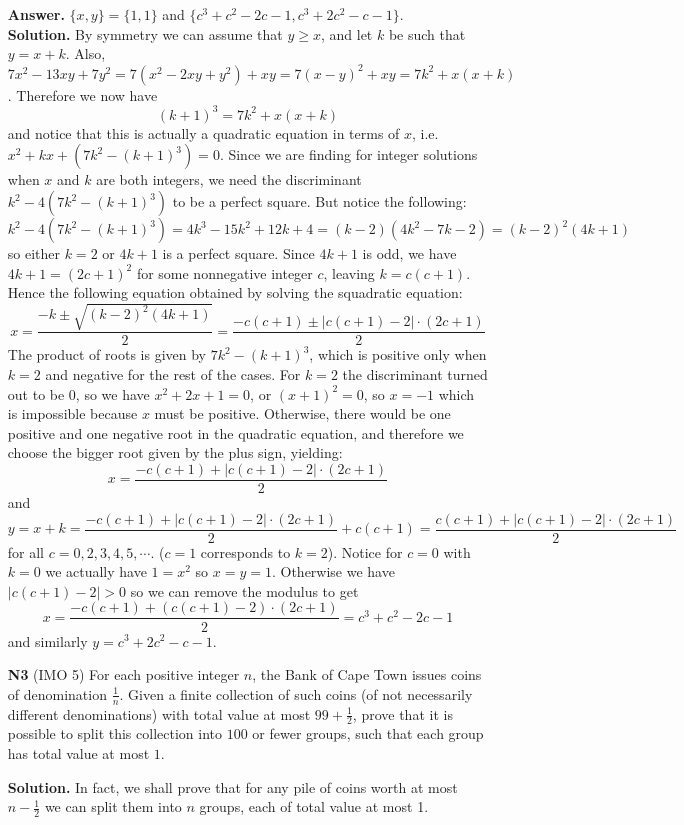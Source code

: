 \documentclass[11pt,a4paper]{article}
\begin{document}
\begin{enumerate}
	\textbf{Answer.} $\{x, y\}=\{1, 1\}$ and $\{c^3+c^2-2c-1, c^3+2c^2-c-1\}$. \\
	\textbf{Solution.} By symmetry we can assume that $y\ge x$, and let $k$ be such that $y=x+k$. Also, $7x^2-13xy+7y^2=7(x^2-2xy+y^2)+xy=7(x-y)^2+xy=7k^2+x(x+k)$. Therefore we now have 
	\[(k+1)^3 = 7k^2+x(x+k)
	\]
	and notice that this is actually a quadratic equation in terms of $x$, i.e. $x^2+kx+(7k^2-(k+1)^3)=0$. Since we are finding for integer solutions when $x$ and $k$ are both integers, we need the discriminant $k^2-4(7k^2-(k+1)^3)$ to be a perfect square. But notice the following: 
	\[
	k^2-4(7k^2-(k+1)^3)=4k^3-15k^2+12k+4=(k-2)(4k^2-7k-2)=(k-2)^2(4k+1)
	\]
	so either $k=2$ or $4k+1$ is a perfect square. Since $4k+1$ is odd, we have $4k+1=(2c+1)^2$ for some nonnegative integer $c$, leaving $k=c(c+1)$. Hence the following equation obtained by solving the squadratic equation: 
	\[
	x=\frac{-k\pm \sqrt{(k-2)^2(4k+1)}}{2}
	=\frac{-c(c+1)\pm |c(c+1)-2|\cdot (2c+1)}{2}
	\]
	The product of roots is given by $7k^2-(k+1)^3$, which is positive only when $k=2$ and negative for the rest of the cases. For $k=2$ the discriminant turned out to be 0, so we have $x^2+2x+1=0$, or $(x+1)^2=0$, so $x=-1$ which is impossible because $x$ must be positive. Otherwise, there would be one positive and one negative root in the quadratic equation, and therefore we choose the bigger root given by the plus sign, yielding: 
	\[
	x=\frac{-c(c+1)+ |c(c+1)-2|\cdot (2c+1)}{2}\]
	and
	\[
	y=x+k = \frac{-c(c+1)+ |c(c+1)-2|\cdot (2c+1)}{2} + c(c+1) 
	=\frac{c(c+1)+ |c(c+1)-2|\cdot (2c+1)}{2}
	\]
	for all $c=0, 2, 3, 4, 5, \cdots $. ($c=1$ corresponds to $k=2$). Notice for $c=0$ with $k=0$ we actually have $1=x^2$ so $x=y=1$. Otherwise we have $|c(c+1)-2|>0$ so 
	we can remove the modulus to get 
	\[
	x=\frac{-c(c+1)+ (c(c+1)-2)\cdot (2c+1)}{2}=c^3+c^2-2c-1
	\]
	and similarly $y=c^3+2c^2-c-1$. 
	
	\item [\textbf{N3}] (IMO 5) For each positive integer $n$, the Bank of Cape Town issues coins of denomination $\frac1n$. Given a finite collection of such coins (of not necessarily different denominations) with total value at most $99+\frac12$, prove that it is possible to split this collection into $100$ or fewer groups, such that each group has total value at most $1$.
	
	\textbf{Solution.} In fact, we shall prove that for any pile of coins worth at most $n-\frac 12$ we can split them into $n$ groups, each of total value at most 1. 
	

\end{enumerate}
\end{document}
